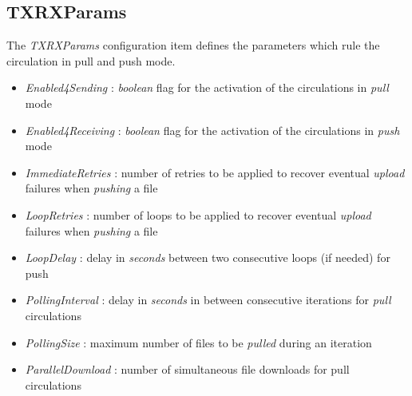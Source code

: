 \documentclass[dec_sum_main.tex]{subfiles}
\begin{document}
\subsection{TXRXParams}
The \textit{TXRXParams} configuration item defines the parameters which rule the circulation in pull and push mode.
\par
\noindent
\begin{itemize}
	\item \textit{Enabled4Sending} : \textit{boolean} flag for the activation of the circulations in \textit{pull} mode
	\item \textit{Enabled4Receiving} : \textit{boolean} flag for the activation of the circulations in \textit{push} mode
	\item \textit{ImmediateRetries} : number of retries to be applied to recover eventual \textit{upload} failures when \textit{pushing} a file
	\item \textit{LoopRetries} : number of loops to be applied to recover eventual \textit{upload} failures when \textit{pushing} a file
	\item \textit{LoopDelay} : delay in \textit{seconds} between two consecutive loops (if needed) for push
	\item \textit{PollingInterval} : delay in \textit{seconds} in between consecutive iterations for \textit{pull} circulations
	\item \textit{PollingSize} : maximum number of files to be \textit{pulled} during an iteration   
	\item \textit{ParallelDownload} : number of simultaneous file downloads for pull circulations
\end{itemize}

\label{Config_Server}
\end{document}
